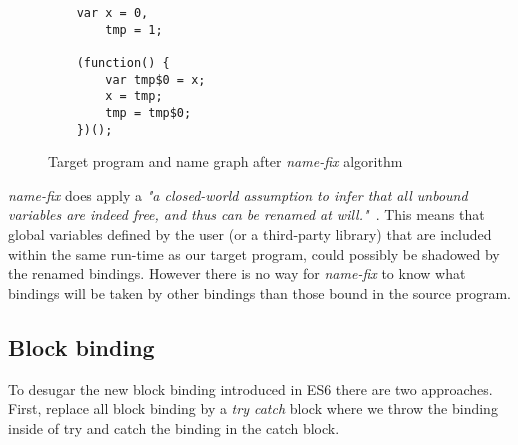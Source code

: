 \begin{figure}[h]
\centering
\begin{minipage}{0.25\linewidth}
\begin{lstlisting}
	var x = 0,
		tmp = 1;

	(function() {
		var tmp$0 = x;
		x = tmp;
		tmp = tmp$0;
	})();
\end{lstlisting}
\end{minipage}
\hfill
\begin{minipage}{0.65\linewidth}
\end{minipage}

\caption{Target program and name graph after \textit{name-fix} algorithm} \label{fig:name-graph-fixed}
\end{figure}

\textit{name-fix} does apply a \textit{"a closed-world assumption to infer that all unbound variables are indeed free, and thus can be renamed at will."}~\cite{Erdweg2014}. This means that global variables defined by the user (or a third-party library) that are included within the same run-time as our target program, could possibly be shadowed by the renamed bindings. However there is no way for \textit{name-fix} to know what bindings will be taken by other bindings than those bound in the source program.

\subsection{Block binding}
To desugar the new block binding introduced in ES6 there are two approaches. First, replace all block binding by a \textit{try catch} block where we throw the binding inside of try and catch the binding in the catch block.


